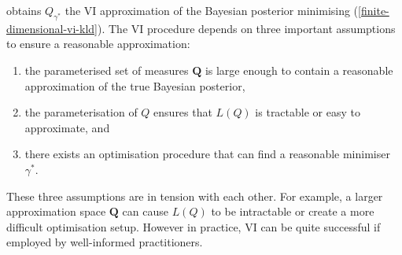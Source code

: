 \documentclass{article}
\numberwithin{equation}{section}
\begin{document}
obtains $Q_{\gamma^*}$ the VI approximation of the Bayesian posterior minimising (\ref{finite-dimensional-vi-kld}). The VI procedure depends on three important assumptions to ensure a reasonable approximation:
\begin{enumerate}
    \item the parameterised set of measures $\boldsymbol{Q}$ is large enough to contain a reasonable approximation of the true Bayesian posterior,
    \item the parameterisation of $Q$ ensures that $L(Q)$ is tractable or easy to approximate, and
    \item there exists an optimisation procedure that can find a reasonable minimiser $\gamma^*$.
\end{enumerate}
These three assumptions are in tension with each other.
For example, a larger approximation space $\boldsymbol{Q}$ can cause $L(Q)$ to be intractable or create a more difficult optimisation setup.
However in practice, VI can be quite successful if employed by well-informed practitioners.
\end{document}
